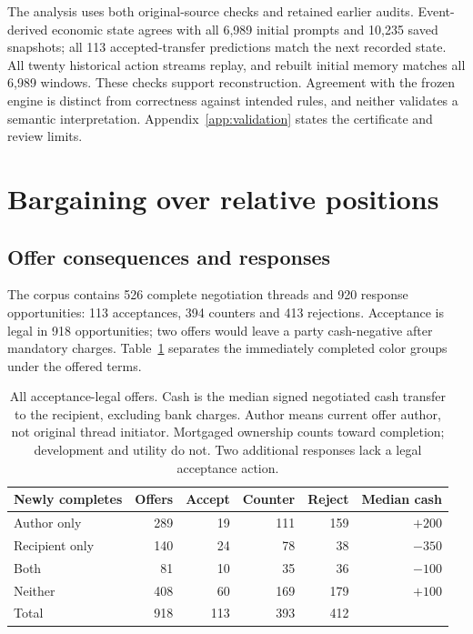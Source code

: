 The analysis uses both original-source checks and retained earlier audits. Event-derived economic state agrees with all 6,989 initial prompts and 10,235 saved snapshots; all 113 accepted-transfer predictions match the next recorded state. All twenty historical action streams replay, and rebuilt initial memory matches all 6,989 windows. These checks support reconstruction. Agreement with the frozen engine is distinct from correctness against intended rules, and neither validates a semantic interpretation. Appendix~\ref{app:validation} states the certificate and review limits.

\section{Bargaining over relative positions}
\label{sec:bargaining}

\subsection{Offer consequences and responses}

The corpus contains 526 complete negotiation threads and 920 response opportunities: 113 acceptances, 394 counters and 413 rejections. Acceptance is legal in 918 opportunities; two offers would leave a party cash-negative after mandatory charges. Table~\ref{tab:offers} separates the immediately completed color groups under the offered terms.

\begin{table}[t]
\centering\small
\begin{tabular}{@{}lrrrrr@{}}
\toprule
Newly completes & Offers & Accept & Counter & Reject & Median cash\\
\midrule
Author only & 289 & 19 & 111 & 159 & $+200$\\
Recipient only & 140 & 24 & 78 & 38 & $-350$\\
Both & 81 & 10 & 35 & 36 & $-100$\\
Neither & 408 & 60 & 169 & 179 & $+100$\\
\midrule
Total & 918 & 113 & 393 & 412 & \\
\bottomrule
\end{tabular}
\caption{All acceptance-legal offers. Cash is the median signed negotiated cash transfer to the recipient, excluding bank charges. Author means current offer author, not original thread initiator. Mortgaged ownership counts toward completion; development and utility do not. Two additional responses lack a legal acceptance action.}
\label{tab:offers}
\end{table}

